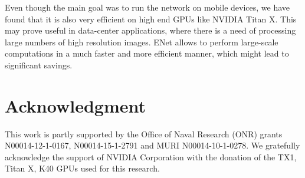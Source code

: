 \documentclass{article}
\begin{document}
Even though the main goal was to run the network on mobile devices, we have found that it is also very efficient on high end GPUs like NVIDIA Titan X.
This may prove useful in data-center applications, where there is a need of processing large numbers of high resolution images.
ENet allows to perform large-scale computations in a much faster and more efficient manner, which might lead to significant savings.

\section*{Acknowledgment}

This work is partly supported by the Office of Naval Research (ONR) grants N00014-12-1-0167, N00014-15-1-2791 and MURI N00014-10-1-0278.
We gratefully acknowledge the support of NVIDIA Corporation with the donation of the TX1, Titan X, K40 GPUs used for this research.

\pagebreak


{
\fontsize{9}{9}
\selectfont
\setlength{\bibsep}{0pt}

}
\end{document}
